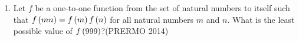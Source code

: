 \begin{enumerate}
	\item Let $f$ be a one-to-one function from the set of natural numbers to itself such that $f\left(mn\right) = f\left(m\right) f\left(n\right)$ for all natural numbers $m$ and $n$. What is the least possible value of $f\left(999\right)$?\hfill(PRERMO 2014)
\end{enumerate}
